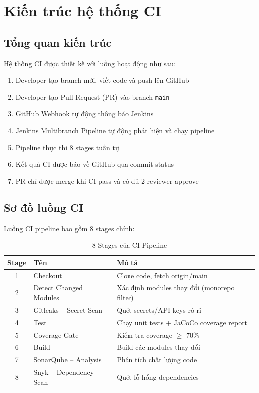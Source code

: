 \section{Kiến trúc hệ thống CI}

\subsection{Tổng quan kiến trúc}
Hệ thống CI được thiết kế với luồng hoạt động như sau:

\begin{enumerate}[noitemsep]
    \item Developer tạo branch mới, viết code và push lên GitHub
    \item Developer tạo Pull Request (PR) vào branch \texttt{main}
    \item GitHub Webhook tự động thông báo Jenkins
    \item Jenkins Multibranch Pipeline tự động phát hiện và chạy pipeline
    \item Pipeline thực thi 8 stages tuần tự
    \item Kết quả CI được báo về GitHub qua commit status
    \item PR chỉ được merge khi CI pass và có đủ 2 reviewer approve
\end{enumerate}

\subsection{Sơ đồ luồng CI}
Luồng CI pipeline bao gồm 8 stages chính:

\begin{table}[H]
\centering
\caption{8 Stages của CI Pipeline}
\begin{tabular}{|c|l|l|}
\hline
\textbf{Stage} & \textbf{Tên} & \textbf{Mô tả} \\
\hline
1 & Checkout & Clone code, fetch origin/main \\
\hline
2 & Detect Changed Modules & Xác định modules thay đổi (monorepo filter) \\
\hline
3 & Gitleaks -- Secret Scan & Quét secrets/API keys rò rỉ \\
\hline
4 & Test & Chạy unit tests + JaCoCo coverage report \\
\hline
5 & Coverage Gate & Kiểm tra coverage $\geq$ 70\% \\
\hline
6 & Build & Build các modules thay đổi \\
\hline
7 & SonarQube -- Analysis & Phân tích chất lượng code \\
\hline
8 & Snyk -- Dependency Scan & Quét lỗ hổng dependencies \\
\hline
\end{tabular}
\end{table}

